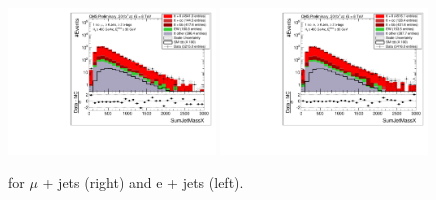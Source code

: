 \begin{figure}[!ht]
    \includegraphics[width=0.49\textwidth]{images/Run1/SumJetMassX_StackLogY_Mu.pdf}
    \includegraphics[width=0.49\textwidth]{images/Run1/SumJetMassX_StackLogY_e.pdf}
    \caption{\sumjetmassX for $\mu$ + jets (right) and e + jets (left).}
    \label{fig:sumjetmassX}
\end{figure}



